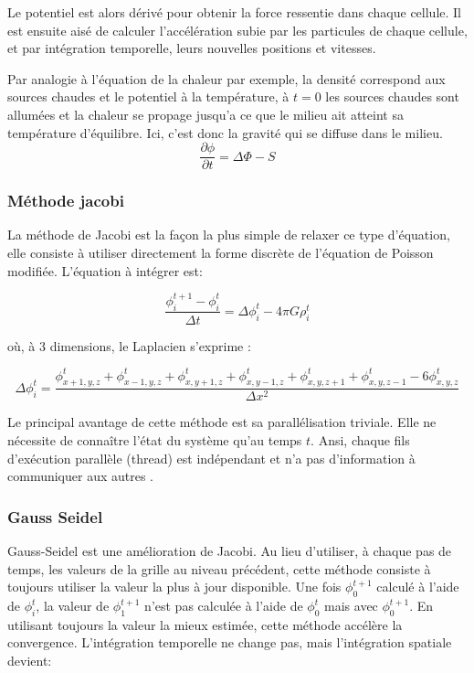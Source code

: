 Le potentiel est alors dérivé pour obtenir la force ressentie dans chaque cellule. Il est ensuite aisé de calculer l'accélération subie par les particules de chaque cellule, et par intégration temporelle, leurs nouvelles positions et vitesses.

Par analogie à l'équation de la chaleur par exemple, la densité correspond aux sources chaudes et le potentiel à la température, à $t=0$ les sources chaudes sont allumées et la chaleur se propage jusqu'a ce que le milieu ait atteint sa température d'équilibre. Ici, c'est donc la gravité qui se diffuse dans le milieu. \\


\begin{equation}
\dfrac{\partial \phi}{\partial t} = \Delta \Phi -S 
\end{equation}


\subsubsection{Méthode jacobi}


La méthode de Jacobi est la façon la plus simple de relaxer ce type d'équation, elle consiste à utiliser directement la forme discrète de l'équation de Poisson modifiée. L'équation à intégrer est:

\[ \dfrac{\phi^{t+1}_i - \phi^{t}_i}{\Delta t}  =  \Delta \phi_i^t - 4 \pi G \rho^t_i \]

où, à 3 dimensions, le Laplacien s'exprime :

\[ \Delta \phi_i^t = \dfrac{\phi_{x+1,y,z}^t  + \phi_{x-1,y,z}^t + \phi_{x,y+1,z}^t  + \phi_{x,y-1,z}^t + \phi_{x,y,z+1}^t + \phi_{x,y,z-1}^t	- 6\phi_{x,y,z}^t}{\Delta x ^2} \]
		
Le principal avantage de cette méthode est sa parallélisation triviale. 
Elle ne nécessite de connaître l'état du système qu'au temps $t$. 
Ansi, chaque fils d'exécution parallèle (thread) est indépendant et n'a pas d'information à communiquer aux autres .



\subsubsection{Gauss Seidel}
Gauss-Seidel est une amélioration de Jacobi. Au lieu d'utiliser, à chaque pas de temps, les valeurs de la grille au niveau précédent, cette méthode consiste à toujours utiliser la valeur la plus à jour disponible. Une fois $\phi^{t+1}_0$ calculé à l'aide de $\phi^{t}_i$, la valeur de $\phi^{t+1}_1$ n'est pas calculée à l'aide de $\phi^{t}_0$ mais avec $\phi^{t+1}_0$. En utilisant toujours la valeur la mieux estimée, cette méthode accélère la convergence. L'intégration temporelle ne change pas, mais l'intégration spatiale devient: 

